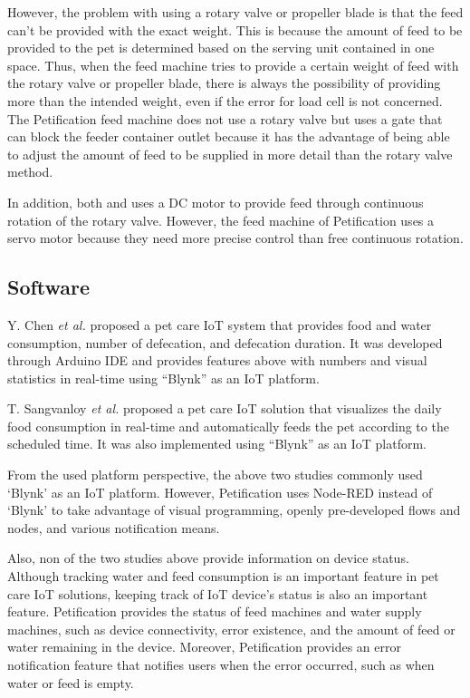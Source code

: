 \documentclass[conference]{IEEEtran}
\begin{document}
However, the problem with using a rotary valve or propeller blade is that the feed can’t be provided with the exact weight. This is because the amount of feed to be provided to the pet is determined based on the serving unit contained in one space. Thus, when the feed machine tries to provide a certain weight of feed with the rotary valve or propeller blade, there is always the possibility of providing more than the intended weight, even if the error for load cell is not concerned. The Petification feed machine does not use a rotary valve but uses a gate that can block the feeder container outlet because it has the advantage of being able to adjust the amount of feed to be supplied in more detail than the rotary valve method.

In addition, both \cite{b12} and \cite{b13} uses a DC motor to provide feed through continuous rotation of the rotary valve. However, the feed machine of Petification uses a servo motor because they need more precise control than free continuous rotation.\cite{b14} 

\subsection{Software}
Y. Chen \textit{et al.} \cite{b5} proposed a pet care IoT system that provides food and water consumption, number of defecation, and defecation duration. It was developed through Arduino IDE and provides features above with numbers and visual statistics in real-time using “Blynk” as an IoT platform.

T. Sangvanloy \textit{et al.} \cite{b4} proposed a pet care IoT solution that visualizes the daily food consumption in real-time and automatically feeds the pet according to the scheduled time. It was also implemented using “Blynk” as an IoT platform.

From the used platform perspective, the above two studies commonly used ‘Blynk’ as an IoT platform. However, Petification uses Node-RED instead of ‘Blynk’ to take advantage of visual programming, openly pre-developed flows and nodes, and various notification means.

Also, non of the two studies above provide information on device status. Although tracking water and feed consumption is an important feature in pet care IoT solutions, keeping track of IoT device’s status is also an important feature. Petification provides the status of feed machines and water supply machines, such as device connectivity, error existence, and the amount of feed or water remaining in the device. Moreover, Petification provides an error notification feature that notifies users when the error occurred, such as when water or feed is empty.
\end{document}
